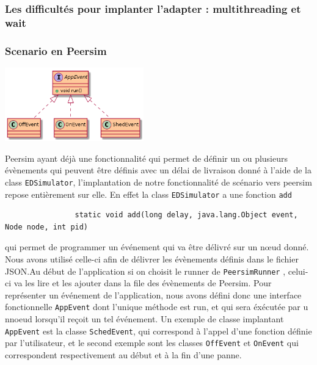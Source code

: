 \documentclass{article}
\begin{document}
				\subsubsection{Les difficultés pour implanter l'adapter : multithreading et wait}
				
				\subsubsection{Scenario en Peersim}
				\vspace{5mm}
				\hspace*{5cm} \includegraphics[width=60mm]{uml/scenPuml.png}
				
				\vspace{5mm}
				Peersim ayant déjà une fonctionnalité qui permet de définir un ou plusieurs évènements qui peuvent être définis avec un délai de livraison donné à l'aide de la class \verb|EDSimulator|, l'implantation de notre fonctionnalité de scénario vers peersim repose entièrement sur elle.
				En effet la class \verb|EDSimulator| a une fonction \verb|add|
				\begin{lstlisting}
				static void add(long delay, java.lang.Object event, Node node, int pid)
				\end{lstlisting}
				qui permet de programmer un événement qui va être délivré sur un nœud donné. \newline
				Nous avons utilisé celle-ci afin de délivrer les évènements définis dans le fichier JSON.\newline Au début de l'application si on choisit le runner de \verb|PeersimRunner| , celui-ci va les lire et les ajouter dans la file des évènements de Peersim.
				Pour représenter un événement de l'application, nous avons défini donc une interface fonctionnelle \verb|AppEvent| dont l'unique méthode est run, et qui sera éxécutée par u nnoeud lorsqu'il reçoit un tel événement. 
				Un exemple de classe implantant \verb|AppEvent| est la classe \verb|SchedEvent|, qui correspond à l'appel d'une fonction définie par l'utilisateur, et le second exemple sont les classes \verb|OffEvent| et \verb|OnEvent| qui correspondent respectivement au début et à la fin d'une panne.
		
\end{document}
